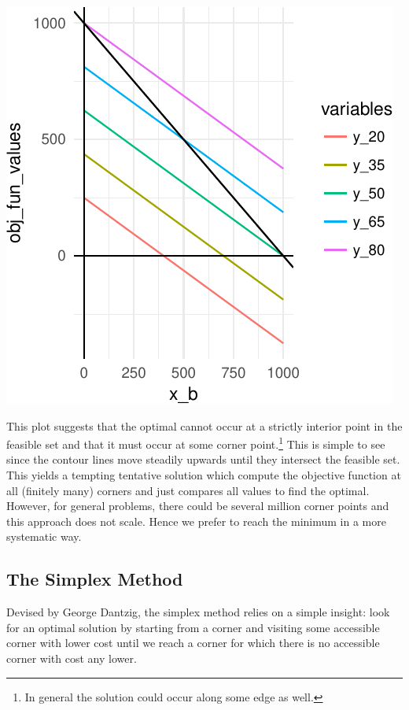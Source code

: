 \documentclass[11pt,]{article}
\let\rmarkdownfootnote\footnote%
\def\footnote{\protect\rmarkdownfootnote}
\begin{document}
\includegraphics{Linear_Programming_files/figure-latex/plot_contour-1.pdf}

This plot suggests that the optimal cannot occur at a strictly interior
point in the feasible set and that it must occur at some corner
point.\footnote{In general the solution could occur along some edge as
  well.} This is simple to see since the contour lines move steadily
upwards until they intersect the feasible set. This yields a tempting
tentative solution which compute the objective function at all (finitely
many) corners and just compares all values to find the optimal. However,
for general problems, there could be several million corner points and
this approach does not scale. Hence we prefer to reach the minimum in a
more systematic way.

\subsection{The Simplex Method}\label{the-simplex-method}

Devised by George Dantzig, the simplex method relies on a simple
insight: look for an optimal solution by starting from a corner and
visiting some accessible corner with lower cost until we reach a corner
for which there is no accessible corner with cost any lower.
\end{document}
